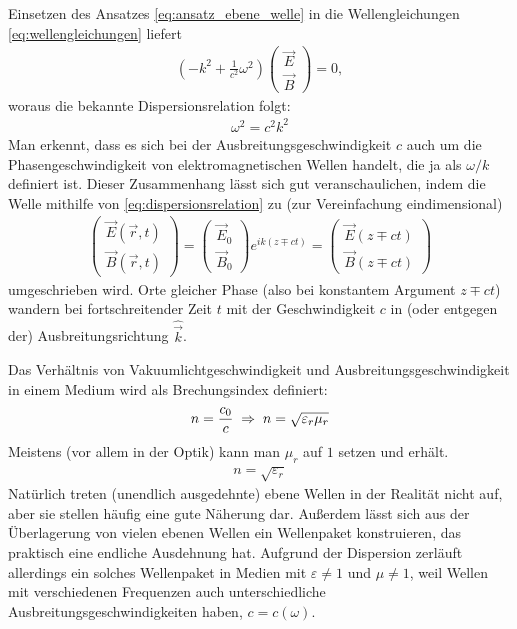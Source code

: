 Einsetzen des Ansatzes \eqref{eq:ansatz_ebene_welle} in die Wellengleichungen \eqref{eq:wellengleichungen} liefert
\begin{align*}
    \left(-k^2+\frac{1}{c^2}\omega^2\right) \begin{pmatrix} \vec E \\ \vec B \end{pmatrix} = 0,
\end{align*}
woraus die bekannte Dispersionsrelation folgt:
\begin{align}
    \label{eq:dispersionsrelation}
    \omega^2 = c^2k^2
\end{align}
Man erkennt, dass es sich bei der Ausbreitungsgeschwindigkeit $c$ auch um die Phasengeschwindigkeit von elektromagnetischen Wellen handelt, die ja als $\omega/k$ definiert ist.
Dieser Zusammenhang lässt sich gut veranschaulichen, indem die Welle mithilfe von \eqref{eq:dispersionsrelation} zu (zur Vereinfachung eindimensional)
\begin{align*}
    \begin{pmatrix}
        \vec E(\vec r,t) \\
        \vec B(\vec r,t)
    \end{pmatrix}
    =
    \begin{pmatrix}
        \vec E_0 \\
        \vec B_0
    \end{pmatrix}
    e^{ik(z \mp ct)} =
    \begin{pmatrix}
        \vec E(z\mp ct) \\
        \vec B(z\mp ct)
    \end{pmatrix}
\end{align*}
umgeschrieben wird. Orte gleicher Phase (also bei konstantem Argument $z\mp ct$) wandern bei fortschreitender Zeit $t$ mit der Geschwindigkeit $c$ in (oder entgegen der) Ausbreitungsrichtung $\hat{\vec k}$.


Das Verhältnis von Vakuumlichtgeschwindigkeit und Ausbreitungsgeschwindigkeit in einem Medium wird als Brechungsindex definiert:
\begin{align}
    \label{eq:definition_brechungsindex}
    n=\frac{c_0}{c} \;\Rightarrow\; n=\sqrt{\varepsilon_r\mu_r}
\end{align}
Meistens (vor allem in der Optik) kann man $\mu_r$ auf $1$ setzen und erhält.
\begin{align*}
    n = \sqrt{\varepsilon_r}
\end{align*}
Natürlich treten (unendlich ausgedehnte) ebene Wellen in der Realität nicht auf, aber sie stellen häufig eine gute Näherung dar.
Außerdem lässt sich aus der Überlagerung von vielen ebenen Wellen ein Wellenpaket konstruieren, das praktisch eine endliche Ausdehnung hat.
Aufgrund der Dispersion zerläuft allerdings ein solches Wellenpaket in Medien mit $\varepsilon\neq 1$ und $\mu\neq 1$, weil Wellen mit verschiedenen Frequenzen auch unterschiedliche Ausbreitungsgeschwindigkeiten haben, $c=c(\omega)$.

